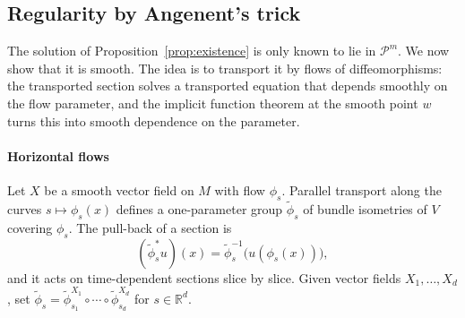 \documentclass[11pt,reqno]{amsart}
\theoremstyle{definition}
\theoremstyle{remark}
\newcommand{\R}{\mathbb{R}}
\newcommand{\Pp}{\mathcal{P}}
\numberwithin{equation}{section}
\begin{document}
\subsection{Regularity by Angenent's trick}\label{sec:regularity}

The solution of Proposition~\ref{prop:existence} is only known to lie in $\Pp^m$. We now show that it
is smooth. The idea is to transport it by flows of diffeomorphisms: the transported section solves a
transported equation that depends smoothly on the flow parameter, and the implicit function theorem at
the smooth point $w$ turns this into smooth dependence on the parameter.

\paragraph{Horizontal flows} Let $X$ be a smooth vector field on $M$ with flow $\phi_s$. Parallel
transport along the curves $s\mapsto\phi_s(x)$ defines a one-parameter group $\tilde\phi_s$ of bundle
isometries of $V$ covering $\phi_s$. The pull-back of a section is
\[
  (\tilde\phi_s^*u)(x)=\tilde\phi_s^{-1}\bigl(u(\phi_s(x))\bigr),
\]
and it acts on time-dependent sections slice by slice. Given vector fields $X_1,\dots,X_d$, set
$\tilde\phi_s=\tilde\phi^{X_1}_{s_1}\circ\cdots\circ\tilde\phi^{X_d}_{s_d}$ for $s\in\R^d$.
\end{document}
